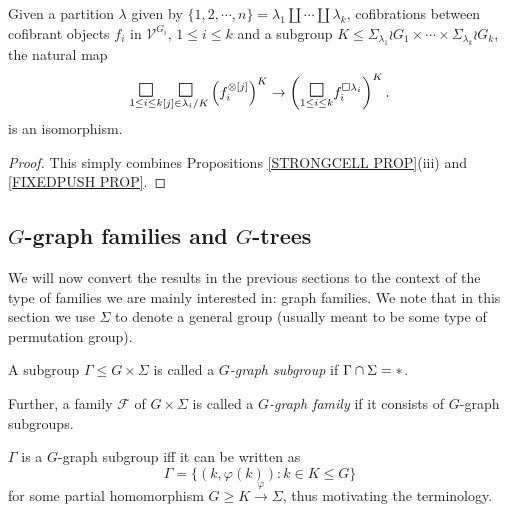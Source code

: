 \documentclass[a4paper,10pt]{article}%
\begin{document}
\begin{corollary}\label{FIXEDPUSH COR}
	Given a partition $\lambda$ given by
	$\{1,2,\cdots,n\} = \lambda_1 \amalg \cdots \amalg \lambda_k$, cofibrations between cofibrant objects $f_i$ in $\mathcal{V}^{G_i}$, $1\leq i \leq k$ and a subgroup
	$K \leq 
	\Sigma_{\lambda_1} \wr G_1
	\times \cdots \times
	\Sigma_{\lambda_k} \wr G_k
	$,
	the natural map
\begin{equation}
	\underset{1\leq i\leq k}{\mathlarger{\mathlarger{\square}}}
	\underset{[j] \in \lambda_i/K}{\mathlarger{\mathlarger{\square}}}
	\left( f_i^{\otimes [j]} \right)^K
\to
	\left( 	\underset{1\leq i\leq k}{\mathlarger{\mathlarger{\square}}}f_i^{\square \lambda_i} \right)^K.
\end{equation}
is an isomorphism.
\end{corollary}

\begin{proof}
This simply combines Propositions \ref{STRONGCELL PROP}(iii) and \ref{FIXEDPUSH PROP}.
\end{proof}




\subsection{$G$-graph families and $G$-trees}


We will now convert the results in the previous sections to the context of the type of families we are mainly interested in: graph families. 
We note that in this section we use $\Sigma$ to denote a general group (usually meant to be some type of permutation group).


\begin{definition}
A subgroup $\Gamma \leq G \times \Sigma$ is called a
\textit{$G$-graph subgroup} if $\Gamma \cap \Sigma = \**$. 

Further, a family $\mathcal{F}$ of $G \times \Sigma$ is called a \textit{$G$-graph family} if it consists of $G$-graph subgroups.
\end{definition}


\begin{remark}\label{GRAPH REM}
$\Gamma$ is a $G$-graph subgroup iff it can be written as
\[
	\Gamma = 
	\{
	(k,\varphi(k)) : k \in K \leq G
	\}
\]
for some partial homomorphism $G \geq K \xrightarrow{\varphi} \Sigma$, thus motivating the terminology.
\end{remark}
\end{document}
